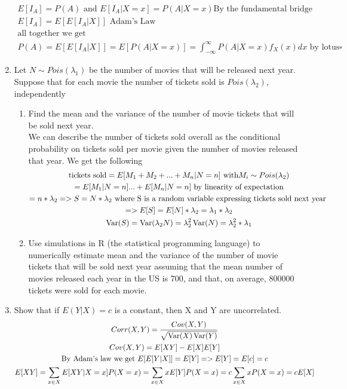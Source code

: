 \documentclass[11pt]{article}
\newcommand{\Var}{\mathop{\rm Var}}
\begin{document}
\begin{enumerate}
\begin{gather}
	E[I_A] = P(A) \text{ and } E[I_A|X=x]=P(A|X=x) \text{By the fundamental bridge} \\ 
	E[I_A] = E[E[I_A|X]] \text{ Adam's Law}\\
	\text{all together we get }\\
	 P(A)= E[E[I_A|X]]=E[P(A|X=x)] = \int_{-\infty}^{\infty}P(A|X=x)f_X(x)dx \text{ by lotus}\square	
\end{gather}
\item Let $N \sim Pois(\lambda_1)$ be the number of movies that will be released next year. Suppose that for each movie the number of tickets sold is $Pois(\lambda_2)$, independently
\begin{enumerate}
	\item Find the mean and the variance of the number of movie tickets that will be sold next year.
	\\
	We can describe the number of tickets sold overall as the conditional probability on tickets sold per movie given the number of movies released that year. We get the following
	\begin{gather}
		\text{tickets sold} = E[M_1+M_2+...+M_n|N=n] \text{ with} M_i \sim Pois(\lambda_2)\\
		= E[M_1|N=n]...+E[M_n|N=n] \text{ by linearity of expectation}\\
		= n*\lambda_2 => S = N*\lambda_2 \text{ where S is a random variable expressing tickets sold next year }\\=> E[S] = E[N]*\lambda_2 = \lambda_1*\lambda_2
		\\
		\Var(S) = \Var(\lambda_2N) = \lambda_2^2\Var(N) = \lambda_2^2*\lambda_1
	\end{gather}
	\item Use simulations in R (the statistical programming language) to numerically estimate mean and the
	variance of the number of movie tickets that will be sold next year assuming that the mean number of movies
	released each year in the US is 700, and that, on average, 800000 tickets were sold for each movie.
\end{enumerate}
\item Show that if $E(Y | X) = c$ is a constant, then X and Y are uncorrelated.
\begin{gather}
	Corr(X,Y) = \frac{Cov(X,Y)}{\sqrt{\Var(X)\Var(Y)}}\\
	Cov(X,Y) = E[XY] - E[X]E[Y]\\
	\text{By Adam's law we get }E[E[Y|X]] = E[Y] => E[Y] = E[c] = c\\
	E[XY] = \sum_{x\in X}E[XY|X=x]P(X=x) = \sum_{x\in X}xE[Y]P(X=x) = c\sum_{x\in X}xP(X=x) = cE[X]\\

\end{gather}
\end{enumerate}
\end{document}
